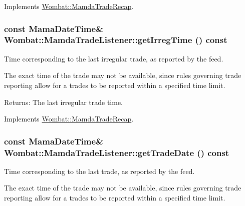 Implements \hyperlink{classWombat_1_1MamdaTradeRecap_0b7056cac747d7dad3679df840219adc}{Wombat::Mamda\-Trade\-Recap}.\hypertarget{classWombat_1_1MamdaTradeListener_a8b74cc931fd2f5453ad7f393145402e}{
\subsubsection[getIrregTime]{\setlength{\rightskip}{0pt plus 5cm}const Mama\-Date\-Time\& Wombat::Mamda\-Trade\-Listener::get\-Irreg\-Time () const}}
\label{classWombat_1_1MamdaTradeListener_a8b74cc931fd2f5453ad7f393145402e}


Time corresponding to the last irregular trade, as reported by the feed. 

The exact time of the trade may not be available, since rules governing trade reporting allow for a trades to be reported within a specified time limit.

\begin{Desc}
\item[Returns:]The last irregular trade time. \end{Desc}


Implements \hyperlink{classWombat_1_1MamdaTradeRecap_3583496cc2f74b2b1537176b8d91f5d9}{Wombat::Mamda\-Trade\-Recap}.\hypertarget{classWombat_1_1MamdaTradeListener_078b15ccd771aae1890bf26e0471c0a6}{
\subsubsection[getTradeDate]{\setlength{\rightskip}{0pt plus 5cm}const Mama\-Date\-Time\& Wombat::Mamda\-Trade\-Listener::get\-Trade\-Date () const}}
\label{classWombat_1_1MamdaTradeListener_078b15ccd771aae1890bf26e0471c0a6}


Time corresponding to the last trade, as reported by the feed. 

The exact time of the trade may not be available, since rules governing trade reporting allow for a trades to be reported within a specified time limit.

